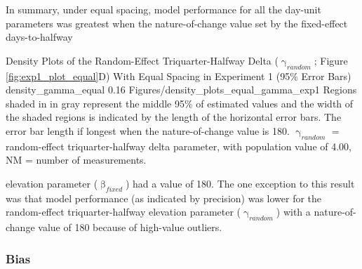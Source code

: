 \documentclass[
12pt, %
twoside,
english]{guelphthesis}
\begin{document}
In summary, under equal spacing, model performance for all the day-unit parameters was greatest when the nature-of-change value set by the fixed-effect days-to-halfway
\begin{apaFigure}
[portrait]
[samepage]
[0cm]
{Density Plots of the Random-Effect Triquarter-Halfway Delta ($\upgamma_{random}$; Figure \ref{fig:exp1_plot_equal}D) With Equal Spacing in Experiment 1 (95\% Error Bars)}
{density_gamma_equal}
{0.16}
{Figures/density_plots_equal_gamma_exp1}
{Regions shaded in in gray represent the middle 95\% of estimated values and the width of the shaded regions is indicated by the length of the horizontal error bars. The error bar length if longest when the nature-of-change value is 180. $\upgamma_{random}$ = random-effect triquarter-halfway delta parameter, with population value of 4.00, NM = number of measurements.}
\end{apaFigure}
\noindent elevation parameter (\(\upbeta_{fixed}\)) had a value of 180. The one exception to this result was that model performance (as indicated by precision) was lower for the random-effect triquarter-halfway elevation parameter (\(\upgamma_{random}\)) with a nature-of-change value of 180 because of high-value outliers.

\hypertarget{bias-equal-exp1}{%
\subsubsection{Bias}\label{bias-equal-exp1}}
\end{document}
